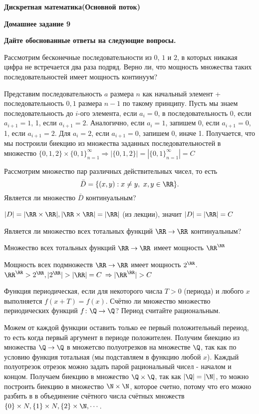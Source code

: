 \documentclass[11pt]{article}
\def\week{9}
\def\theproblem{К\week.\arabic{problem}}
\begin{document}
	\setcounter{problem}{0}
	\def\theproblem{Д\week.\arabic{problem}}
	{\textbf{\large Дискретная математика}\hfill \textbf{(Основной поток)}
		
		\medskip %
		
		\textbf{Домашнее задание \week}}
	
	\medskip
	
	\textbf{Дайте обоснованные ответы на следующие вопросы.}
	
	
	\vspace{5mm}
	
	
	\p Рассмотрим бесконечные последовательности из $0$, $1$ и $2$, в
	которых никакая цифра не встречается два раза подряд. Верно ли, что
	мощность множества таких последовательностей имеет мощность континуум?
	
	Представим последовательность $a$ размера $n$ как начальный элемент + последовательность  ${0,1}$ размера $n - 1$ по такому принципу. Пусть мы знаем последовательность до $i$-ого элемента, если $a_i = 0$, в последовательность 0, если $a_{i + 1} = 1$, 1, если $a_{i + 1} = 2$. Аналогично, если $a_i = 1$, запишем 0, если $a_{i + 1} = 0$, 1, если $a_{i + 1} = 2$. Для $a_i = 2$, если $a_{i + 1} = 0$, запишем 0, иначе 1. Получается, что мы построили биекцию из множества заданных последовательностей в множество $\{0,1,2\}\times{\{0,1\}}_{n = 1}^{\infty} \Rightarrow |\{0,1,2\}| = |{\{0,1\}}_{n = 1}^{\infty}| = C$ 
	
	
	\p Рассмотрим множество пар различных действительных чисел, то есть
	\[\bar D = \{(x,y) : x\ne y, \ x,y\in \RR\}.\] Является ли множество $\bar D$ континуальным?
	
	$|D| = |\RR \times \RR|, |\RR \times \RR| = |\RR|$ (из лекции), значит $|D| = |\RR| = C$ 
	
	
	\p Является ли множество всех тотальных функций $\RR\to\RR$ континуальным?
	
	Множество всех тотальных функций $\RR\to\RR$ имеет мощность $\RR^{\RR}$
	
	Мощность всех подмножеств $\RR\to\RR$ имеет мощность $2^\RR$. $\RR^{\RR} > 2^\RR, |2^\RR| > |\RR| = C$ $\Rightarrow |\RR^{\RR}| > C$ 
	
	
	\p Функция периодическая, если для некоторого числа $T>0$ (периода) и любого $x$ выполняется $f(x+T)=f(x)$. Счётно ли множество множество периодических функций  $f\colon \Q\to\Q$? Период считайте рациональным. 
	
	Можем от каждой функции оставить только ее первый положительный переиод, то есть когда первый аргумент в  периоде положителен. Получим биекцию из множества  $\Q\to\Q$ в множетсво полуотрезков на множестве $\Q$, так как по условию функция тотальная (мы подставляем в функцию любой $x$). Каждый полуотрезок отрезок можно задать парой рациональный чисел - началом и концом. Получаем биекцию в множество $\Q \times \Q$, так как $|\Q| = |\N|$, то можно построить биекцию в множество $\N \times \N$, которое счетно, потому что его можно разбить в в объединение счётного числа счётных множеств $\{0\} \times N, \{1\} \times N, \{2\} \times \N, \cdots$. 
	
	
\end{document}
